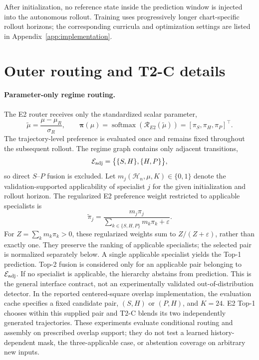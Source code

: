 \documentclass{article}
\providecommand{\DIFaddtex}[1]{{\protect\color{blue} \sf #1}} %
\providecommand{\DIFdeltex}[1]{{\protect\color{red} \scriptsize #1}} %
\providecommand{\DIFaddbegin}{} %
\providecommand{\DIFaddend}{} %
\providecommand{\DIFdelbegin}{} %
\providecommand{\DIFdelend}{} %
\providecommand{\DIFadd}[1]{\texorpdfstring{\DIFaddtex{#1}}{#1}} %
\providecommand{\DIFdel}[1]{\texorpdfstring{\DIFdeltex{#1}}{}} %
\providecommand{\DIFscaledelfig}{0.5}
\newlength{\DIFdelgraphicswidth} %
\newlength{\DIFdelgraphicsheight} %
\providecommand{\DIFaddincludegraphics}[2][]{{\color{blue}\fbox{\DIFOincludegraphics[#1]{#2}}}} %
\providecommand{\DIFdelincludegraphics}[2][]{%
\sbox{\DIFdelgraphicsbox}{\DIFOincludegraphics[#1]{#2}}%
\settoboxwidth{\DIFdelgraphicswidth}{\DIFdelgraphicsbox} %
\settoboxtotalheight{\DIFdelgraphicsheight}{\DIFdelgraphicsbox} %
\scalebox{\DIFscaledelfig}{%
\parbox[b]{\DIFdelgraphicswidth}{\usebox{\DIFdelgraphicsbox}\\[-\baselineskip] \rule{\DIFdelgraphicswidth}{0em}}\llap{\resizebox{\DIFdelgraphicswidth}{\DIFdelgraphicsheight}{%
\setlength{\unitlength}{\DIFdelgraphicswidth}%
\begin{picture}(1,1)%
\thicklines\linethickness{2pt} %
{\color[rgb]{1,0,0}\put(0,0){\framebox(1,1){}}}%
{\color[rgb]{1,0,0}\put(0,0){\line( 1,1){1}}}%
{\color[rgb]{1,0,0}\put(0,1){\line(1,-1){1}}}%
\end{picture}%
}\hspace*{3pt}}} %
} %
\DeclareRobustCommand{\DIFaddbegin}{\DIFOaddbegin \let\includegraphics\DIFaddincludegraphics} %
\DeclareRobustCommand{\DIFaddend}{\DIFOaddend \let\includegraphics\DIFOincludegraphics} %
\DeclareRobustCommand{\DIFdelbegin}{\DIFOdelbegin \let\includegraphics\DIFdelincludegraphics} %
\DeclareRobustCommand{\DIFdelend}{\DIFOaddend \let\includegraphics\DIFOincludegraphics} %
\begin{document}
\DIFaddend After initialization, no reference state inside the prediction window is
injected into the autonomous rollout. Training uses progressively longer
chart-specific rollout horizons; the corresponding curricula and
optimization settings are listed in Appendix~\ref{app:implementation}.

\section{Outer routing and T2-C details}
\label{app:routing}

\paragraph{Parameter-only regime routing.}
The E2 router receives only the standardized scalar parameter,
\begin{equation}
  \widetilde\mu
  =
  \frac{\mu-\mu_R}{\sigma_R},
  \qquad
  \bm\pi(\mu)
  =
  \operatorname{softmax}
  \left(
    \mathcal R_{E2}(\widetilde\mu)
  \right)
  =
  [\pi_S,\pi_H,\pi_P]^\top .
  \label{eq:app_e2_parameter_only}
\end{equation}
The trajectory-level preference is evaluated once and remains fixed
throughout the subsequent rollout. The regime graph contains only adjacent transitions,
\begin{equation}
  \mathcal E_{\rm adj}
  =
  \bigl\{
    \{S,H\},
    \{H,P\}
  \bigr\},
  \label{eq:app_adjacency}
\end{equation}
so direct $S$--$P$ fusion is excluded.
Let
$m_j(\mathcal H_n,\mu,K)\in\{0,1\}$
denote the validation-supported applicability of specialist $j$ for the
given initialization and rollout horizon.
The \DIFaddbegin \DIFadd{regularized }\DIFaddend E2 \DIFdelbegin \DIFdel{preference }\DIFdelend \DIFaddbegin \DIFadd{weight }\DIFaddend restricted to applicable specialists is
\begin{equation}
  \widetilde\pi_j
  =
  \frac{
    m_j\pi_j
  }{
    \sum_{k\in\{S,H,P\}}m_k\pi_k+\varepsilon
  }.
  \label{eq:app_masked_e2}
\end{equation}
\DIFaddbegin \DIFadd{For $Z=\sum_k m_k\pi_k>0$, these regularized weights sum to $Z/(Z+\varepsilon)$, rather than exactly one. They preserve the ranking of applicable specialists; the selected pair is normalized separately below. }\DIFaddend A single applicable specialist yields the Top-1 prediction.
Top-2 fusion is considered only for an applicable pair belonging to
$\mathcal E_{\rm adj}$.
If no specialist is applicable, the hierarchy abstains from prediction. \DIFaddbegin \DIFadd{This is the general interface contract, not an experimentally validated out-of-distribution detector. In the reported centered-square overlap implementation, the evaluation cache specifies a fixed candidate pair, $(S,H)$ or $(P,H)$, and $K=24$. E2 Top-1 chooses within this supplied pair and T2-C blends its two independently generated trajectories. These experiments evaluate conditional routing and assembly on prescribed overlap support; they do not test a learned history-dependent mask, the three-applicable case, or abstention coverage on arbitrary new inputs.
}\DIFaddend 
\end{document}
